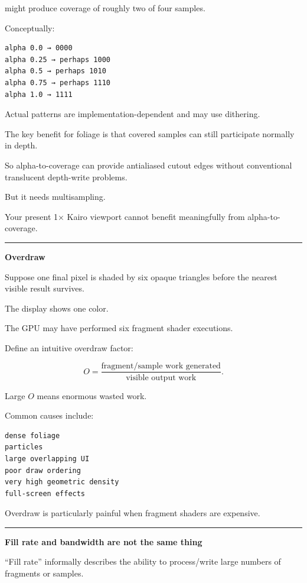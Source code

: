 might produce coverage of roughly two of four samples.

Conceptually:

\begin{verbatim}
alpha 0.0 → 0000
alpha 0.25 → perhaps 1000
alpha 0.5 → perhaps 1010
alpha 0.75 → perhaps 1110
alpha 1.0 → 1111
\end{verbatim}

Actual patterns are implementation-dependent and may use dithering.

The key benefit for foliage is that covered samples can still participate normally in depth.

So alpha-to-coverage can provide antialiased cutout edges without conventional translucent depth-write problems.

But it needs multisampling.

Your present 1× Kairo viewport cannot benefit meaningfully from alpha-to-coverage.

\begin{center}\rule{0.5\linewidth}{0.5pt}\end{center}

\textbf{Overdraw}

Suppose one final pixel is shaded by six opaque triangles before the nearest visible result survives.

The display shows one color.

The GPU may have performed six fragment shader executions.

Define an intuitive overdraw factor:

\[
O=
\frac{\text{fragment/sample work generated}}
{\text{visible output work}}.
\]

Large \(O\) means enormous wasted work.

Common causes include:

\begin{verbatim}
dense foliage
particles
large overlapping UI
poor draw ordering
very high geometric density
full-screen effects
\end{verbatim}

Overdraw is particularly painful when fragment shaders are expensive.

\begin{center}\rule{0.5\linewidth}{0.5pt}\end{center}

\textbf{Fill rate and bandwidth are not the same thing}

``Fill rate'' informally describes the ability to process/write large numbers of fragments or samples.

